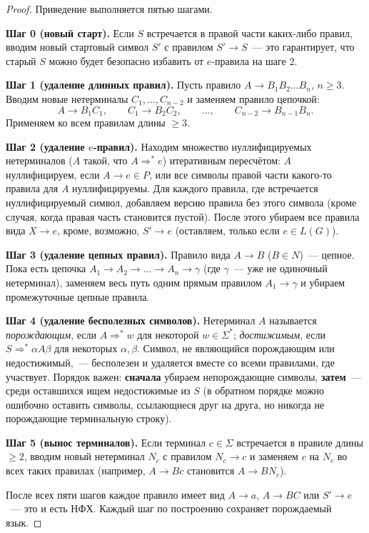 \documentclass[12pt]{article}
\begin{document}
    \begin{proof}
    	Приведение выполняется пятью шагами.
    	
    	\textbf{Шаг 0 (новый старт).} Если $S$ встречается в правой части каких-либо правил, вводим новый стартовый символ $S'$ с правилом $S' \rightarrow S$~--- это гарантирует, что старый $S$ можно будет безопасно избавить от $e$-правила на шаге 2.
    	
    	\textbf{Шаг 1 (удаление длинных правил).} Пусть правило $A \rightarrow B_1B_2 \ldots B_n$, $n \geqslant 3$. Вводим новые нетерминалы $C_1, \ldots, C_{n-2}$ и заменяем правило цепочкой:
    	\[
    	A \rightarrow B_1C_1, \qquad C_1 \rightarrow B_2C_2, \qquad \ldots, \qquad C_{n-2} \rightarrow B_{n-1}B_n.
    	\]
    	Применяем ко всем правилам длины $\geqslant 3$.
    	
    	\textbf{Шаг 2 (удаление $e$-правил).} Находим множество нуллифицируемых нетерминалов ($A$ такой, что $A \Rightarrow^* e$) итеративным пересчётом: $A$ нуллифицируем, если $A \rightarrow e \in P$, или все символы правой части какого-то правила для $A$ нуллифицируемы. Для каждого правила, где встречается нуллифицируемый символ, добавляем версию правила без этого символа (кроме случая, когда правая часть становится пустой). После этого убираем все правила вида $X \rightarrow e$, кроме, возможно, $S' \rightarrow e$ (оставляем, только если $e \in L(G)$).
    	
    	\textbf{Шаг 3 (удаление цепных правил).} Правило вида $A \rightarrow B$ ($B \in N$)~--- цепное. Пока есть цепочка $A_1 \rightarrow A_2 \rightarrow \ldots \rightarrow A_n \rightarrow \gamma$ (где $\gamma$~--- уже не одиночный нетерминал), заменяем весь путь одним прямым правилом $A_1 \rightarrow \gamma$ и убираем промежуточные цепные правила.
    	
    	\textbf{Шаг 4 (удаление бесполезных символов).} Нетерминал $A$ называется \emph{порождающим}, если $A \Rightarrow^* w$ для некоторой $w \in \Sigma^*$; \emph{достижимым}, если $S \Rightarrow^* \alpha A \beta$ для некоторых $\alpha, \beta$. Символ, не являющийся порождающим или недостижимый,~--- бесполезен и удаляется вместе со всеми правилами, где участвует. Порядок важен: \textbf{сначала} убираем непорождающие символы, \textbf{затем}~--- среди оставшихся ищем недостижимые из $S$ (в обратном порядке можно ошибочно оставить символы, ссылающиеся друг на друга, но никогда не порождающие терминальную строку).
    	
    	\textbf{Шаг 5 (вынос терминалов).} Если терминал $c \in \Sigma$ встречается в правиле длины $\geqslant 2$, вводим новый нетерминал $N_c$ с правилом $N_c \rightarrow c$ и заменяем $c$ на $N_c$ во всех таких правилах (например, $A \rightarrow Bc$ становится $A \rightarrow BN_c$).
    	
    	После всех пяти шагов каждое правило имеет вид $A \rightarrow a$, $A \rightarrow BC$ или $S' \rightarrow e$~--- это и есть НФХ. Каждый шаг по построению сохраняет порождаемый язык.
    \end{proof}
    
\end{document}
